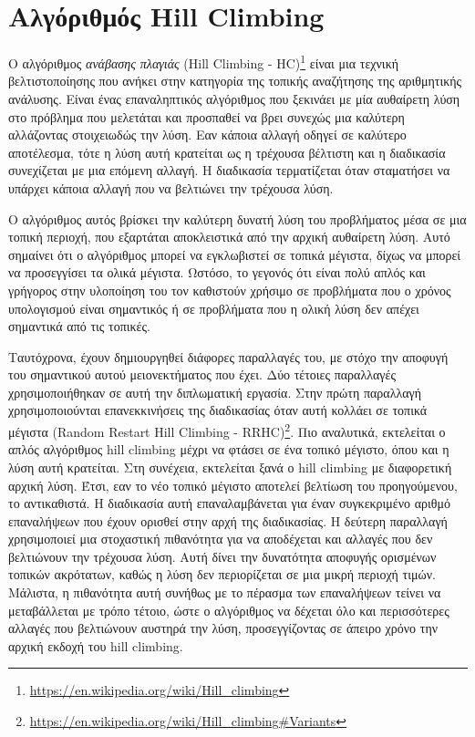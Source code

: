 \section{Αλγόριθμός Hill Climbing}
\label{section:hill_climbing}

O αλγόριθμος \emph{ανάβασης πλαγιάς} (Hill Climbing - HC)\footnote{\href{https://en.wikipedia.org/wiki/Hill_climbing}{https://en.wikipedia.org/wiki/Hill\_climbing}} είναι μια τεχνική βελτιστοποίησης που ανήκει στην κατηγορία της τοπικής αναζήτησης της αριθμητικής ανάλυσης. Είναι ένας επαναληπτικός αλγόριθμος που ξεκινάει με μία αυθαίρετη λύση στο πρόβλημα που μελετάται και προσπαθεί να βρει συνεχώς μια καλύτερη αλλάζοντας στοιχειωδώς την λύση. Εαν κάποια αλλαγή οδηγεί σε καλύτερο αποτέλεσμα, τότε η λύση αυτή κρατείται ως η τρέχουσα βέλτιστη και η διαδικασία συνεχίζεται με μια επόμενη αλλαγή. Η διαδικασία τερματίζεται όταν σταματήσει να υπάρχει κάποια αλλαγή που να βελτιώνει την τρέχουσα λύση. 

Ο αλγόριθμος αυτός βρίσκει την καλύτερη δυνατή λύση του προβλήματος μέσα σε μια τοπική περιοχή, που εξαρτάται αποκλειστικά από την αρχική αυθαίρετη λύση. Αυτό σημαίνει ότι ο αλγόριθμος μπορεί να εγκλωβιστεί σε τοπικά μέγιστα, δίχως να μπορεί να προσεγγίσει τα ολικά μέγιστα. Ωστόσο, το γεγονός ότι είναι πολύ απλός και γρήγορος στην υλοποίηση του τον καθιστούν χρήσιμο σε προβλήματα που ο χρόνος υπολογισμού είναι σημαντικός ή σε προβλήματα που η ολική λύση δεν απέχει σημαντικά από τις τοπικές.

Ταυτόχρονα, έχουν δημιουργηθεί διάφορες παραλλαγές του, με στόχο την αποφυγή του σημαντικού αυτού μειονεκτήματος που έχει. Δύο τέτοιες παραλλαγές χρησιμοποιήθηκαν σε αυτή την διπλωματική εργασία. Στην πρώτη παραλλαγή χρησιμοποιούνται επανεκκινήσεις της διαδικασίας όταν αυτή κολλάει σε τοπικά μέγιστα (Random Restart Hill Climbing - RRHC)\footnote{\href{https://en.wikipedia.org/wiki/Hill_climbing#Variants}{https://en.wikipedia.org/wiki/Hill\_climbing#Variants}}. Πιο αναλυτικά, εκτελείται ο απλός αλγόριθμος hill climbing μέχρι να φτάσει σε ένα τοπικό μέγιστο, όπου και η λύση αυτή κρατείται. Στη συνέχεια, εκτελείται ξανά ο hill climbing με διαφορετική αρχική λύση. Έτσι, εαν το νέο τοπικό μέγιστο αποτελεί βελτίωση του προηγούμενου, το αντικαθιστά. Η διαδικασία αυτή επαναλαμβάνεται για έναν συγκεκριμένο αριθμό επαναλήψεων που έχουν ορισθεί στην αρχή της διαδικασίας. Η δεύτερη παραλλαγή χρησιμοποιεί μια στοχαστική πιθανότητα για να αποδέχεται και αλλαγές που δεν βελτιώνουν την τρέχουσα λύση. Αυτή δίνει την δυνατότητα αποφυγής ορισμένων τοπικών ακρότατων, καθώς η λύση δεν περιορίζεται σε μια μικρή περιοχή τιμών. Μάλιστα, η πιθανότητα αυτή συνήθως με το πέρασμα των επαναλήψεων τείνει να μεταβάλλεται με τρόπο τέτοιο, ώστε ο αλγόριθμος να δέχεται όλο και περισσότερες αλλαγές που βελτιώνουν αυστηρά την λύση, προσεγγίζοντας σε άπειρο χρόνο την αρχική εκδοχή του hill climbing.

